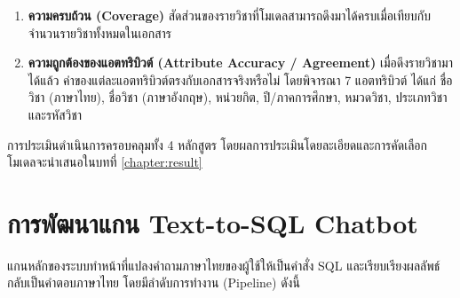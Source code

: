 \begin{enumerate}
    \item \textbf{ความครบถ้วน (Coverage)} สัดส่วนของรายวิชาที่โมเดลสามารถดึงมาได้ครบเมื่อเทียบกับจำนวนรายวิชาทั้งหมดในเอกสาร
    \item \textbf{ความถูกต้องของแอตทริบิวต์ (Attribute Accuracy / Agreement)} เมื่อดึงรายวิชามาได้แล้ว ค่าของแต่ละแอตทริบิวต์ตรงกับเอกสารจริงหรือไม่ โดยพิจารณา 7 แอตทริบิวต์ ได้แก่ ชื่อวิชา (ภาษาไทย), ชื่อวิชา (ภาษาอังกฤษ), หน่วยกิต, ปี/ภาคการศึกษา, หมวดวิชา, ประเภทวิชา และรหัสวิชา
\end{enumerate}

การประเมินดำเนินการครอบคลุมทั้ง 4 หลักสูตร โดยผลการประเมินโดยละเอียดและการคัดเลือกโมเดลจะนำเสนอในบทที่ \ref{chapter:result}

\section{การพัฒนาแกน Text-to-SQL Chatbot}

แกนหลักของระบบทำหน้าที่แปลงคำถามภาษาไทยของผู้ใช้ให้เป็นคำสั่ง SQL และเรียบเรียงผลลัพธ์กลับเป็นคำตอบภาษาไทย โดยมีลำดับการทำงาน (Pipeline) ดังนี้

